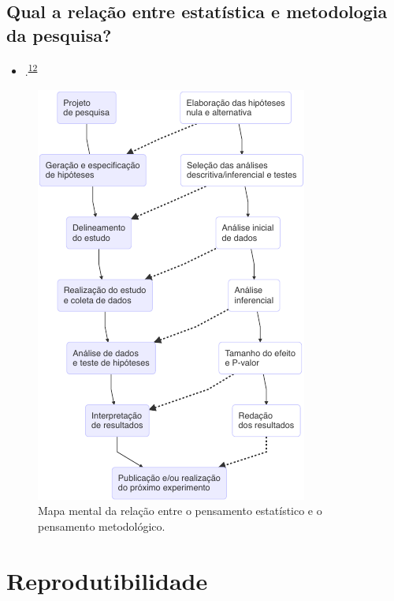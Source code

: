 \documentclass[
  a4paper,
]{book}
\providecommand{\tightlist}{%
  \setlength{\itemsep}{0pt}\setlength{\parskip}{0pt}}
\begin{document}
\hypertarget{qual-a-relauxe7uxe3o-entre-estatuxedstica-e-metodologia-da-pesquisa}{%
\subsection{Qual a relação entre estatística e metodologia da pesquisa?}\label{qual-a-relauxe7uxe3o-entre-estatuxedstica-e-metodologia-da-pesquisa}}

\begin{itemize}
\tightlist
\item
  .\textsuperscript{\protect\hyperlink{ref-munafuxf22017}{12}}
\end{itemize}

\begin{figure}

{\centering \includegraphics{Ciencia-com-R_files/figure-latex/unnamed-chunk-2-1} 

}

\caption{Mapa mental da relação entre o pensamento estatístico e o pensamento metodológico.}\label{fig:unnamed-chunk-2}
\end{figure}

\hypertarget{reprodutibilidade}{%
\section{Reprodutibilidade}\label{reprodutibilidade}}
\end{document}
